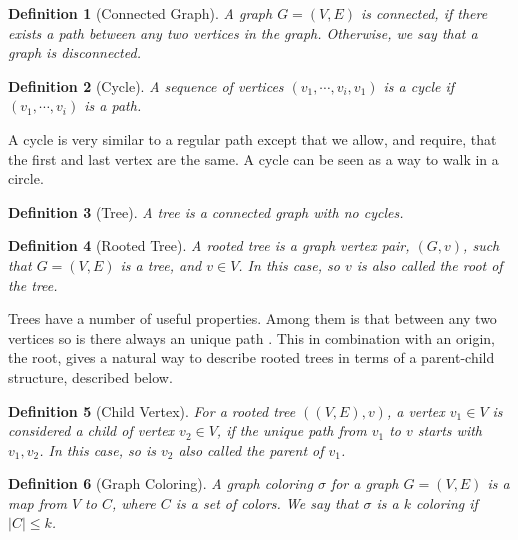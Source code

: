 \documentclass[a4paper]{article}
\newtheorem{definition}{Definition}[section]
\begin{document}

\begin{definition}[Connected Graph]
    A graph $G = (V,E)$ is connected, if there exists a path between any two
    vertices in the graph. Otherwise, we say that a graph is disconnected.
\end{definition}


\begin{definition}[Cycle]
    A sequence of vertices $(v_1,\cdots,v_i,v_1)$ is a cycle
    if $(v_1,\cdots,v_i)$ is a path.
\end{definition}

A cycle is very similar to a regular path except that we allow, and require,
that the first and last vertex are the same. A cycle can be seen as a way to walk
in a circle. 

\begin{definition}[Tree]{\cite{Trees}}
    A tree is a connected graph with no cycles.
\end{definition}
\begin{definition}[Rooted Tree]{\cite{Trees}}
    A rooted tree is a graph vertex pair, $(G,v)$, such that $G = (V,E)$ is a tree,
    and $v \in V$. In this case, so $v$ is also called the root of the tree.
\end{definition}

Trees have a number of useful properties. Among them is that between any two
vertices so is there always an unique path \cite{Trees}. This in combination
with an origin, the root, gives a natural way to describe rooted trees in terms
of a parent-child structure, described below.

\begin{definition}[Child Vertex]{\cite{Trees}}
    For a rooted tree $((V,E),v)$, a vertex $v_1 \in V$ is considered a child
    of vertex $v_2 \in V$, if the unique path from $v_1$ to $v$ starts with
    $v_1,v_2$. In this case, so is $v_2$ also called the parent of $v_1$.
\end{definition}


\begin{definition}[Graph Coloring]
    A graph coloring $\sigma$ for a graph $G = (V,E)$ is a map from $V$ to $C$,
    where $C$ is a set of colors. We say that $\sigma$
    is a $k$ coloring if $|C| \leq k$.
\end{definition}
\end{document}
